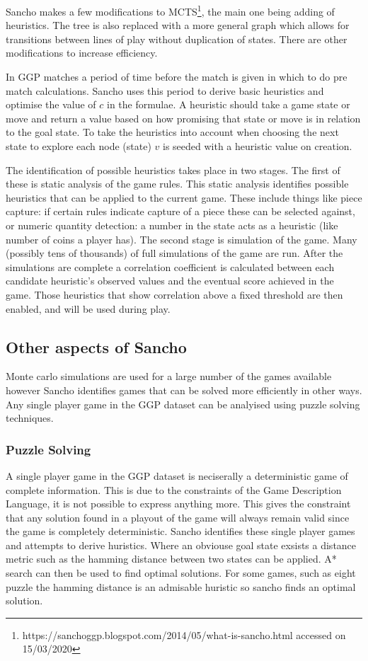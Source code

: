 \documentclass[a4paper,10pt]{report}
\begin{document}
Sancho makes a few modifications to MCTS\footnote{https://sanchoggp.blogspot.com/2014/05/what-is-sancho.html accessed on 15/03/2020}, the main one being adding of heuristics. The tree is also replaced with a more general graph which allows for transitions between lines of play without duplication of states. There are other modifications to increase efficiency.

In GGP matches a period of time before the match is given in which to do pre match calculations. Sancho uses this period to derive basic heuristics and optimise the value of $c$ in the formulae. A heuristic should take a game state or move and return a value based on how promising that state or move is in relation to the goal state. To take the heuristics into account when choosing the next state to explore each node (state) $v$ is seeded with a heuristic value on creation.

The identification of possible heuristics takes place in two stages. The first of these is static analysis of the game rules. This static analysis identifies possible heuristics that can be applied to the current game. These include things like piece capture: if certain rules indicate capture of a piece these can be selected against, or numeric quantity detection: a number in the state acts as a heuristic (like number of coins a player has). The second stage is simulation of the game. Many (possibly tens of thousands) of full simulations of the game are run. After the simulations are complete a correlation coefficient is calculated between each candidate heuristic's observed values and the eventual score achieved in the game. Those heuristics that show correlation above a fixed threshold are then enabled, and will be used during play.

\subsection{Other aspects of Sancho}
Monte carlo simulations are used for a large number of the games available however Sancho identifies games that can be solved more efficiently in other ways. Any single player game in the GGP dataset can be analyised using puzzle solving techniques. 
\subsubsection{Puzzle Solving}
A single player game in the GGP dataset is neciserally a deterministic game of complete information. This is due to the constraints of the Game Description Language, it is not possible to express anything more. This gives the constraint that any solution found in a playout of the game will always remain valid since the game is completely deterministic. Sancho identifies these single player games and attempts to derive huristics. Where an obviouse goal state exsists a distance metric such as the hamming distance between two states can be applied. A* search can then be used to find optimal solutions. For some games, such as eight puzzle the hamming distance is an admisable huristic so sancho finds an optimal solution.
\end{document}
